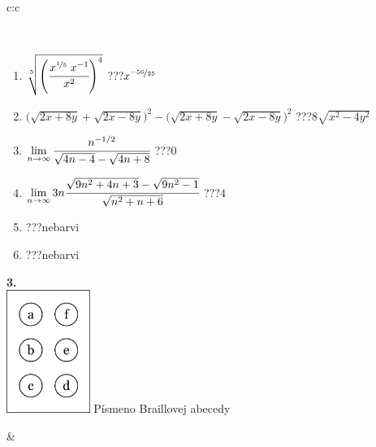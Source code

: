\documentclass[10pt]{report}
\begin{document}
\begin{tabular}{c:c}
\begin{minipage}[c][104.5mm][t]{0.5\linewidth}
\begin{center}
\begin{minipage}{0.95\linewidth}
\begin{center}
\end{center}
\end{minipage}
\\[1mm]
\begin{minipage}{0.79\linewidth}
\begin{center}
\begin{varwidth}{\linewidth}
\begin{enumerate}
\small
\item $\sqrt[5]{\left(\cfrac{x^{\nicefrac{1}{5}}\;x^{-1}}{x^{2}}\right)^{4}}$\quad \dotfill\; ???\;\dotfill \quad $x^{\nicefrac{-56}{25}}$
\item {\footnotesize{\scriptsize$\big(\sqrt{2x+8y}+\sqrt{2x-8y}\big)^2-\big(\sqrt{2x+8y}-\sqrt{2x-8y}\big)^2$}\quad \dotfill\; ???\;\dotfill \quad $8\sqrt{x^2-4y^2}$}
\item $\lim\limits_{n\to\infty}\cfrac{n^{-1/2}}{\sqrt{4n-4}-\sqrt{4n+8}}$\quad \dotfill\; ???\;\dotfill \quad $0$
\item $\lim\limits_{n\to\infty}3n\cfrac{\sqrt{9n^2+4n+3}-\sqrt{9n^2-1}}{\sqrt{n^2+n+6}}$\quad \dotfill\; ???\;\dotfill \quad $4$
\item \quad \dotfill\; ???\;\dotfill \quad nebarvi
\item \quad \dotfill\; ???\;\dotfill \quad nebarvi
\end{enumerate}
\end{varwidth}
\end{center}
\end{minipage}
\begin{minipage}{0.20\linewidth}
\begin{center}
{\Huge\bfseries 3.} \\[2mm]
\includegraphics[height=40mm]{../images/braille.png}
{\small Písmeno Braillovej abecedy}
\end{center}
\end{minipage}
\end{center}
\end{minipage}
&
\begin{minipage}[c][104.5mm][t]{0.5\linewidth}
\begin{center}
\vspace{7mm}

\end{center}
\end{minipage}
\end{tabular}
\end{document}

